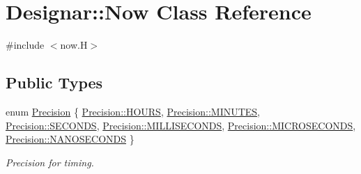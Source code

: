 \hypertarget{class_designar_1_1_now}{}\section{Designar\+:\+:Now Class Reference}
\label{class_designar_1_1_now}


{\ttfamily \#include $<$now.\+H$>$}

\subsection*{Public Types}
\begin{DoxyCompactItemize}
\item 
enum \hyperlink{class_designar_1_1_now_a3c9f5e57907c88cbe63c70a64638c072}{Precision} \{ \newline
\hyperlink{class_designar_1_1_now_a3c9f5e57907c88cbe63c70a64638c072a5ab9376a7869a83e84e94bcb25aa8cbd}{Precision\+::\+H\+O\+U\+RS}, 
\hyperlink{class_designar_1_1_now_a3c9f5e57907c88cbe63c70a64638c072a7ffb9cea885bcba59e55574d54f819c2}{Precision\+::\+M\+I\+N\+U\+T\+ES}, 
\hyperlink{class_designar_1_1_now_a3c9f5e57907c88cbe63c70a64638c072aa9126caa6ef3db9cf3c35ac627ad22b5}{Precision\+::\+S\+E\+C\+O\+N\+DS}, 
\hyperlink{class_designar_1_1_now_a3c9f5e57907c88cbe63c70a64638c072ab4fd5e5c06e72437a57379576df36936}{Precision\+::\+M\+I\+L\+L\+I\+S\+E\+C\+O\+N\+DS}, 
\newline
\hyperlink{class_designar_1_1_now_a3c9f5e57907c88cbe63c70a64638c072a98a5b3971201a65b35d420793d7148ea}{Precision\+::\+M\+I\+C\+R\+O\+S\+E\+C\+O\+N\+DS}, 
\hyperlink{class_designar_1_1_now_a3c9f5e57907c88cbe63c70a64638c072a5b3b43ddfdecac6712fd1dbc20798e6b}{Precision\+::\+N\+A\+N\+O\+S\+E\+C\+O\+N\+DS}
 \}\begin{DoxyCompactList}\small\item\em Precision for timing. \end{DoxyCompactList}
\end{DoxyCompactItemize}
